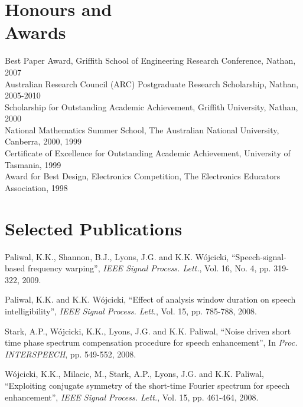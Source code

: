 \documentclass[margin,line]{resumeFormat2}
\begin{document}
\begin{resumeFormat2}
    \section{\mysidestyle Honours and\\Awards} 

    Best Paper Award, Griffith School of Engineering Research Conference, Nathan, 2007              \vspace{1mm}\\%
    Australian Research Council (ARC) Postgraduate Research Scholarship, Nathan, 2005-2010          \vspace{1mm}\\%
    Scholarship for Outstanding Academic Achievement, Griffith University, Nathan, 2000             \vspace{1mm}\\%
    National Mathematics Summer School, The Australian National University, Canberra, 2000, 1999    \vspace{1mm}\\%
    Certificate of Excellence for Outstanding Academic Achievement, University of Tasmania, 1999    \vspace{1mm}\\%
    Award for Best Design, Electronics Competition, The Electronics Educators Association, 1998 


    \section{\mysidestyle Selected Publications}

    Paliwal, K.K., Shannon, B.J., Lyons, J.G. and K.K. W\'ojcicki,
    ``Speech-signal-based frequency warping'',
    \textsl{IEEE Signal Process. Lett.}, Vol. 16, No. 4, pp. 319-322, 2009.

\vspace{-2mm}
    Paliwal, K.K. and K.K. W\'ojcicki,
    ``Effect of analysis window duration on speech intelligibility'',
    \textsl{IEEE Signal Process. Lett.}, Vol. 15, pp. 785-788, 2008.

\vspace{-2mm}
    Stark, A.P., W\'ojcicki, K.K., Lyons, J.G. and K.K. Paliwal,
    ``Noise driven short time phase spectrum compensation procedure for speech enhancement'',
    In \textsl{Proc. INTERSPEECH}, pp. 549-552, 2008.

\vspace{-2mm}
    W\'ojcicki, K.K., Milacic, M., Stark, A.P., Lyons, J.G. and K.K. Paliwal,
    ``Exploiting conjugate symmetry of the short-time Fourier spectrum for speech enhancement'',
    \textsl{IEEE Signal Process. Lett.}, Vol. 15, pp. 461-464, 2008.


\end{resumeFormat2}
\end{document}

